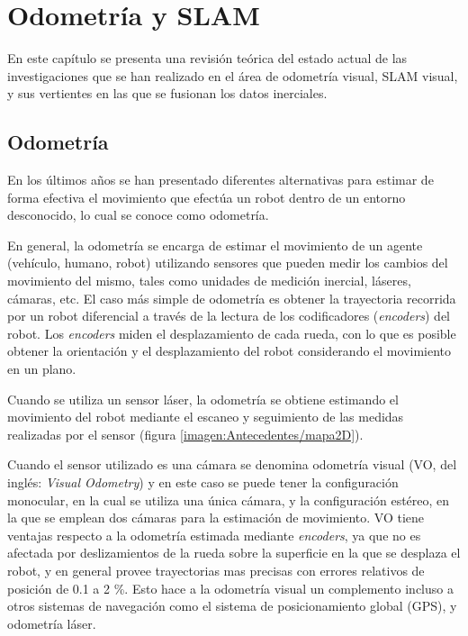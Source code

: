 \chapter{Odometría y SLAM}
\label{capitulo2}

En este capítulo se presenta una revisión teórica del estado actual de las investigaciones que se han realizado en el área de odometría visual, SLAM visual, y sus vertientes en las que se fusionan los datos inerciales.

\section{Odometría}

En los últimos años se han presentado diferentes alternativas para estimar de forma efectiva el movimiento que efectúa un robot dentro de un entorno desconocido, lo cual se conoce como odometría.

En general, la odometría se encarga de estimar el movimiento de un agente (vehículo, humano, robot) utilizando sensores que pueden medir los cambios del movimiento del mismo, tales como unidades de medición inercial, láseres, cámaras, etc. El caso más simple de odometría es obtener la trayectoria recorrida por un robot diferencial a través de la lectura de los codificadores (\textit{encoders}) del robot. Los \textit{encoders} miden el desplazamiento de cada rueda, con lo que es posible obtener la orientación y el desplazamiento del robot considerando el movimiento en un plano.

Cuando se utiliza un sensor láser, la odometría se obtiene estimando el movimiento del robot mediante el escaneo y seguimiento de las medidas realizadas por el sensor (figura \ref{imagen:Antecedentes/mapa2D}).

Cuando el sensor utilizado es una cámara se denomina odometría visual (VO, del inglés: \textit{Visual Odometry}) y en este caso se puede tener la configuración monocular, en la cual se utiliza una única cámara, y la configuración estéreo, en la que se emplean dos cámaras para la estimación de movimiento. VO tiene ventajas respecto a la odometría estimada mediante \textit{encoders}, ya que no es afectada por deslizamientos de la rueda sobre la superficie en la que se desplaza el robot, y en general provee trayectorias mas precisas con errores relativos de posición de 0.1 a 2 \%. Esto hace a la odometría visual un complemento incluso a otros sistemas de navegación como el sistema de posicionamiento global (GPS), y odometría láser.

